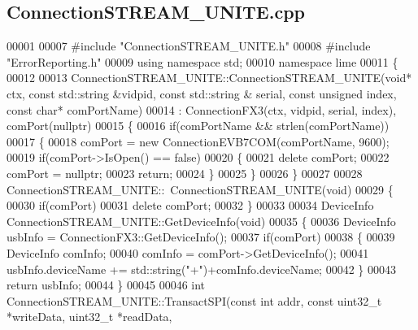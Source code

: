 \subsection{Connection\+S\+T\+R\+E\+A\+M\+\_\+\+U\+N\+I\+T\+E.\+cpp}
\label{ConnectionSTREAM__UNITE_8cpp_source}

\begin{DoxyCode}
00001 
00007 \textcolor{preprocessor}{#include "ConnectionSTREAM_UNITE.h"}
00008 \textcolor{preprocessor}{#include "ErrorReporting.h"}
00009 \textcolor{keyword}{using namespace }std;
00010 \textcolor{keyword}{namespace }lime
00011 \{
00012 
00013 ConnectionSTREAM\_UNITE::ConnectionSTREAM\_UNITE(\textcolor{keywordtype}{void}* ctx, \textcolor{keyword}{const} std::string &vidpid, \textcolor{keyword}{const} std::string &
      serial, \textcolor{keyword}{const} \textcolor{keywordtype}{unsigned} index, \textcolor{keyword}{const} \textcolor{keywordtype}{char}* comPortName)
00014     : ConnectionFX3(ctx, vidpid, serial, index), comPort(nullptr)
00015 \{
00016     \textcolor{keywordflow}{if}(comPortName && strlen(comPortName))
00017     \{
00018         comPort = \textcolor{keyword}{new} ConnectionEVB7COM(comPortName, 9600);
00019         \textcolor{keywordflow}{if}(comPort->IsOpen() == \textcolor{keyword}{false})
00020         \{
00021             \textcolor{keyword}{delete} comPort;
00022             comPort = \textcolor{keyword}{nullptr};
00023             \textcolor{keywordflow}{return};
00024         \}
00025     \}
00026 \}
00027 
00028 ConnectionSTREAM_UNITE::~ConnectionSTREAM_UNITE(\textcolor{keywordtype}{void})
00029 \{
00030     \textcolor{keywordflow}{if}(comPort)
00031         \textcolor{keyword}{delete} comPort;
00032 \}
00033 
00034 DeviceInfo ConnectionSTREAM_UNITE::GetDeviceInfo(\textcolor{keywordtype}{void})
00035 \{
00036     DeviceInfo usbInfo = ConnectionFX3::GetDeviceInfo();
00037     \textcolor{keywordflow}{if}(comPort)
00038     \{
00039         DeviceInfo comInfo;
00040         comInfo = comPort->GetDeviceInfo();
00041         usbInfo.deviceName += std::string(\textcolor{stringliteral}{"+"})+comInfo.deviceName;
00042     \}
00043     \textcolor{keywordflow}{return} usbInfo;
00044 \}
00045 
00046 \textcolor{keywordtype}{int} ConnectionSTREAM_UNITE::TransactSPI(\textcolor{keyword}{const} \textcolor{keywordtype}{int} addr, \textcolor{keyword}{const} uint32\_t *writeData, uint32\_t *readData, \textcolor{keyword}{
}
\end{DoxyCode}
